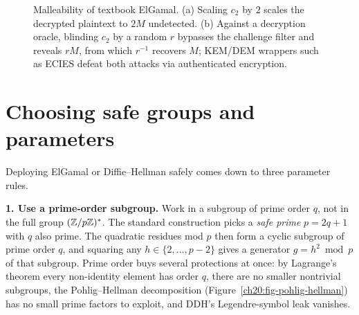 \begin{figure}[htbp]
\caption{Malleability of textbook ElGamal. (a) Scaling $c_2$ by $2$ scales the decrypted plaintext to $2M$ undetected. (b) Against a decryption oracle, blinding $c_2$ by a random $r$ bypasses the challenge filter and reveals $rM$, from which $r^{-1}$ recovers $M$; KEM/DEM wrappers such as ECIES defeat both attacks via authenticated encryption.}
\label{ch20:fig-elgamal-malleability}
\end{figure}

\section{Choosing safe groups and parameters}
\label{ch20:params}

Deploying ElGamal or Diffie--Hellman safely comes down to three parameter rules.

\textbf{1. Use a prime-order subgroup.} Work in a subgroup of prime order $q$, not in the full group $(\mathbb{Z}/p\mathbb{Z})^{*}$.
The standard construction picks a \emph{safe prime} $p = 2q + 1$ with $q$ also prime. The
quadratic residues mod $p$ then form a cyclic subgroup of prime order $q$, and squaring any $h \in \{2, \dots, p-2\}$ gives a generator $g = h^2 \bmod p$ of that subgroup. Prime order buys several protections at once: by Lagrange's theorem every non-identity element has order $q$, there are no smaller nontrivial subgroups, the Pohlig--Hellman decomposition (Figure~\ref{ch20:fig-pohlig-hellman}) has no small prime factors to exploit, and DDH's Legendre-symbol leak vanishes.

